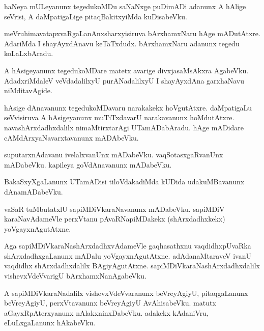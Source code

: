 \documentclass{article}
\begin{document}
\begin{mn}
haNeya mULeyanunx tegedukoMDu saNaNxge puDimADi adanunx A hAlige
seVrisi, A daMpatigaLige pitaqBakitxyiMda kuDisabeVku.
\end{mn}

\begin{mn}
meVruhimavatapxvaRgaLanAnxsharxyisiruva bArxhamxNaru hAge
mADutAtxre. AdariMda I shayAyxdAnavu keTaTxdudx. bArxhamxNaru adanunx
tegedu koLaLxbAradu.
\end{mn}

\begin{mn}
A hAsigeyanunx tegedukoMDare matetx avarige divxjasaMsAkxra
AgabeVku. AdadxriMdaleV veVdadalilxyU purANadalilxyU I shayAyxdAna
garxhaNavu niMditavAgide.
\end{mn}

\begin{mn}
hAsige dAnavanunx tegedukoMDavaru narakakekx hoVgutAtxre. daMpatigaLu
seVvisiruva A hAsigeyanunx muTiTxdavarU narakavanunx
hoMdutAtxre. navashArxdadhxdalilx nimaMtirxtarAgi UTamADabAradu. hAge
mADidare cAMdArxyaNavarxtavanunx mADAbeVku.
\end{mn}

\begin{mn}%
suputarxnAdavanu ivelalxvanUnx mADabeVku. vaqSotasxgaRvanUnx
mADabeVku. kapileya goVdAnavanunx mADabeVku.
\end{mn}

\begin{mn}
BakaSxyXgaLanunx UTamADisi tiloVdakadiMda kUDida udakuMBavanunx dAnamADabeVku.
\end{mn}

\begin{mn}
vaSaR tuMbutatxlU sapiMDiVkaraNavanunx mADabeVku. sapiMDiV
karaNavAdameVle perxVtanu pAvaRNapiMDakekx (shArxdadhxkekx) yoVgayxnAgutAtxne.
\end{mn}

\begin{mn}
Aga sapiMDiVkaraNashArxdadhxvAdameVle gaqhasathxnu vaqdidhxpUvaRka
shArxdadhxgaLanunx mADalu yoVgayxnAgutAtxne. adAdanaMtaraveV ivanU
vaqdidhx shArxdadhxdalilx
BAgiyAgutAtxne. sapiMDiVkaraNashArxdadhxdalilx vishevxVdeVvarigU bArxhamxNanAgabeVku.
\end{mn}

\begin{mn}
A sapiMDiVkaraNadalilx vishevxVdeVvaranunx beVreyAgiyU, pitaqgaLanunx
beVreyAgiyU, perxVtavanunx beVreyAgiyU AvAhisabeVku. matutx
aGayxRpAterxyanunx nAlakxninxDabeVku. adakekx kAdaniVru, eLuLxgaLanunx hAkabeVku.
\end{mn}
\end{document}
